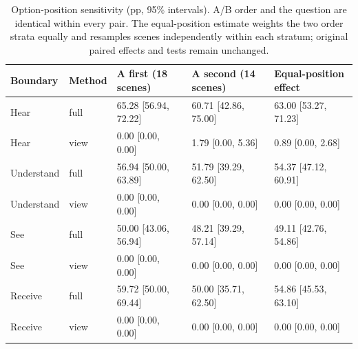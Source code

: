 \documentclass[11pt]{article}
\begin{document}
\begin{table}[t]
\centering\small
\begin{lrbox}{\OCtable}\begin{tabular}{@{}lllll@{}}
\toprule
Boundary & Method & A first (18 scenes) & A second (14 scenes) & Equal-position effect\\
\midrule
Hear & full & 65.28 [56.94, 72.22] & 60.71 [42.86, 75.00] & 63.00 [53.27, 71.23]\\
Hear & view & 0.00 [0.00, 0.00] & 1.79 [0.00, 5.36] & 0.89 [0.00, 2.68]\\
Understand & full & 56.94 [50.00, 63.89] & 51.79 [39.29, 62.50] & 54.37 [47.12, 60.91]\\
Understand & view & 0.00 [0.00, 0.00] & 0.00 [0.00, 0.00] & 0.00 [0.00, 0.00]\\
See & full & 50.00 [43.06, 56.94] & 48.21 [39.29, 57.14] & 49.11 [42.76, 54.86]\\
See & view & 0.00 [0.00, 0.00] & 0.00 [0.00, 0.00] & 0.00 [0.00, 0.00]\\
Receive & full & 59.72 [50.00, 69.44] & 50.00 [35.71, 62.50] & 54.86 [45.53, 63.10]\\
Receive & view & 0.00 [0.00, 0.00] & 0.00 [0.00, 0.00] & 0.00 [0.00, 0.00]\\
\bottomrule
\end{tabular}\end{lrbox}
\ifdim\wd\OCtable>\linewidth\PackageError{access-paper}{Table tab:choiceorder exceeds its column}{Revise the table layout.}\fi
\usebox{\OCtable}
\caption{Option-position sensitivity (pp, 95\% intervals). A/B order and the question are identical within every pair. The equal-position estimate weights the two order strata equally and resamples scenes independently within each stratum; original paired effects and tests remain unchanged.}
\label{tab:choiceorder}
\end{table}
\end{document}
